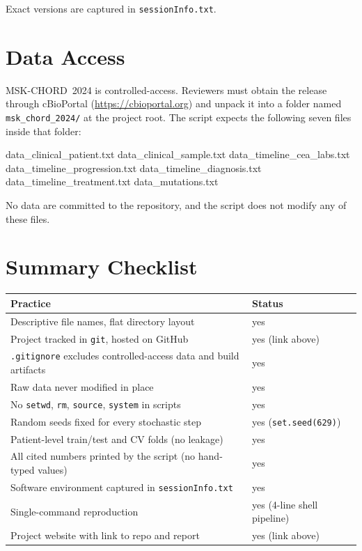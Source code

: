 \documentclass[11pt]{article}
\begin{document}
\noindent Exact versions are captured in \texttt{sessionInfo.txt}.

\section{Data Access}

MSK-CHORD~2024 is controlled-access. Reviewers must obtain the release through cBioPortal (\url{https://cbioportal.org}) and unpack it into a folder named \texttt{msk\_chord\_2024/} at the project root. The script expects the following seven files inside that folder:

\begin{code}
data_clinical_patient.txt
data_clinical_sample.txt
data_timeline_cea_labs.txt
data_timeline_progression.txt
data_timeline_diagnosis.txt
data_timeline_treatment.txt
data_mutations.txt
\end{code}

\noindent No data are committed to the repository, and the script does not modify any of these files.

\section{Summary Checklist}

\begin{tabular}{ll}
\toprule
Practice & Status \\
\midrule
Descriptive file names, flat directory layout & yes \\
Project tracked in \texttt{git}, hosted on GitHub & yes (link above) \\
\texttt{.gitignore} excludes controlled-access data and build artifacts & yes \\
Raw data never modified in place & yes \\
No \texttt{setwd}, \texttt{rm}, \texttt{source}, \texttt{system} in scripts & yes \\
Random seeds fixed for every stochastic step & yes (\texttt{set.seed(629)}) \\
Patient-level train/test and CV folds (no leakage) & yes \\
All cited numbers printed by the script (no hand-typed values) & yes \\
Software environment captured in \texttt{sessionInfo.txt} & yes \\
Single-command reproduction & yes (4-line shell pipeline) \\
Project website with link to repo and report & yes (link above) \\
\bottomrule
\end{tabular}
\end{document}
